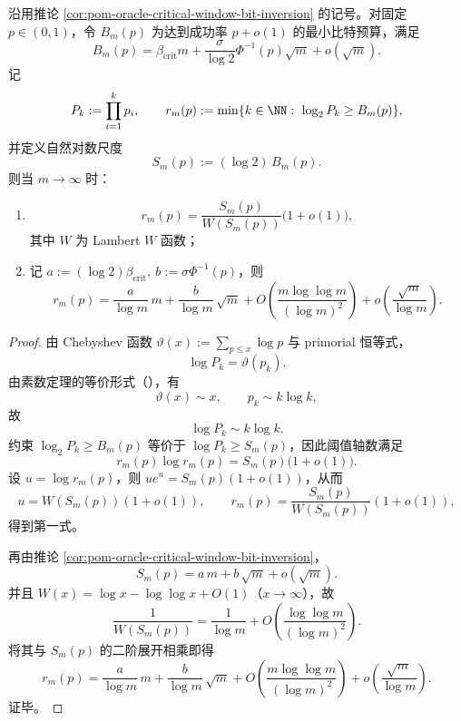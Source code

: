 

\begin{theorem}\label{thm:conclusion-primorial-axis-second-order}
沿用推论 \ref{cor:pom-oracle-critical-window-bit-inversion} 的记号。对固定 \(p\in(0,1)\)，令 \(B_m(p)\) 为达到成功率 \(p+o(1)\) 的最小比特预算，满足
\[
B_m(p)
=
\beta_{\mathrm{crit}}m
+
\frac{\sigma}{\log 2}\Phi^{-1}(p)\sqrt m
+
o(\sqrt m).
\]
记
\[
P_k:=\prod_{i=1}^{k}p_i,
\qquad
r_m(p):=\min\{k\in\NN:\ \log_2 P_k\ge B_m(p)\},
\]
并定义自然对数尺度
\[
S_m(p):=(\log 2)\,B_m(p).
\]
则当 \(m\to\infty\) 时：
\begin{enumerate}
  \item
  \[
  r_m(p)=\frac{S_m(p)}{W(S_m(p))}\bigl(1+o(1)\bigr),
  \]
  其中 \(W\) 为 Lambert \(W\) 函数；
  \item 记 \(a:=(\log 2)\beta_{\mathrm{crit}},\ b:=\sigma\Phi^{-1}(p)\)，则
  \[
  r_m(p)
  =
  \frac{a}{\log m}\,m
  +
  \frac{b}{\log m}\,\sqrt m
  +
  O\!\left(\frac{m\log\log m}{(\log m)^2}\right)
  +
  o\!\left(\frac{\sqrt m}{\log m}\right).
  \]
\end{enumerate}
\end{theorem}
\begin{proof}
由 Chebyshev 函数
\(
\vartheta(x):=\sum_{p\le x}\log p
\)
与 primorial 恒等式，
\[
\log P_k=\vartheta(p_k).
\]
由素数定理的等价形式（\cite{Apostol1976}），有
\[
\vartheta(x)\sim x,\qquad p_k\sim k\log k,
\]
故
\[
\log P_k\sim k\log k.
\]
约束 \(\log_2 P_k\ge B_m(p)\) 等价于 \(\log P_k\ge S_m(p)\)，因此阈值轴数满足
\[
r_m(p)\log r_m(p)=S_m(p)\bigl(1+o(1)\bigr).
\]
设 \(u=\log r_m(p)\)，则 \(ue^u=S_m(p)(1+o(1))\)，从而
\[
u=W(S_m(p))(1+o(1)),
\qquad
r_m(p)=\frac{S_m(p)}{W(S_m(p))}(1+o(1)),
\]
得到第一式。

再由推论 \ref{cor:pom-oracle-critical-window-bit-inversion}，
\[
S_m(p)=a\,m+b\,\sqrt m+o(\sqrt m).
\]
并且 \(W(x)=\log x-\log\log x+O(1)\)（\(x\to\infty\)），故
\[
\frac{1}{W(S_m(p))}
=
\frac{1}{\log m}
+
O\!\left(\frac{\log\log m}{(\log m)^2}\right).
\]
将其与 \(S_m(p)\) 的二阶展开相乘即得
\[
r_m(p)
=
\frac{a}{\log m}\,m
+
\frac{b}{\log m}\,\sqrt m
+
O\!\left(\frac{m\log\log m}{(\log m)^2}\right)
+
o\!\left(\frac{\sqrt m}{\log m}\right).
\]
证毕。
\end{proof}

